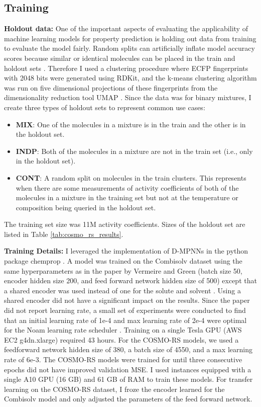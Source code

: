 \subsection{Training}
\noindent
\textbf{Holdout data:} One of the important aspects of evaluating the applicability of machine learning models for property prediction is holding out data from training to evaluate the model fairly. Random splits can artificially inflate model accuracy scores because similar or identical molecules can be placed in the train and holdout sets \cite{Kovacs2021}. Therefore I used a clustering procedure where  ECFP fingerprints with 2048 bits were generated using RDKit, and the k-means clustering algorithm \cite{MacQueen1967} was run on five dimensional projections of these fingerprints from the dimensionality reduction tool UMAP \cite{McInnes2018}. Since the data was for binary mixtures, I create three types of holdout sets to represent common use cases:

\begin{itemize}
    \item \textbf{MIX}: One of the molecules in a mixture is in the train and the other is in the holdout set.
    \item \textbf{INDP}: Both of the molecules in a mixture are not in the train set (i.e., only in the holdout set).
    \item \textbf{CONT}: A random split on molecules in the train clusters. This represents when there are some measurements of activity coefficients of both of the molecules in a mixture in the training set but not at the temperature or composition being queried in the holdout set. 
\end{itemize}

The training set size was 11M activity coefficients. Sizes of the holdout set are listed in Table \ref{tab:cosmo_rs_results}.

\noindent
\textbf{Training Details:} I leveraged the implementation of D-MPNNs in the python package chemprop \cite{Yang2019, Heid2023}. A model was trained on the Combisolv dataset using the same hyperparameters as in the paper by Vermeire and Green (batch size 50, encoder hidden size 200, and feed forward network hidden size of 500) except that a shared encoder was used instead of one for the solute and solvent \cite{Vermeire2021}. Using a shared encoder did not have a significant impact on the results. Since the paper did not report learning rate, a small set of experiments were conducted to find that an initial learning rate of 1e-4 and max learning rate of 2e-4 were optimal for the Noam learning rate scheduler \cite{Vaswani2017}. Training on a single Tesla GPU (AWS EC2 g4dn.xlarge) required 43 hours. For the COSMO-RS models, we used a feedforward network hidden size of 380, a batch size of 4550, and a max learning rate of 6e-3.  The COSMO-RS models were trained for until three consecutive epochs did not have improved validation MSE. I used instances equipped with a single A10 GPU (16 GB) and 61 GB of RAM to train these models. For transfer learning on the COSMO-RS dataset, I froze the encoder learned for the Combisolv model and only adjusted the parameters of the feed forward network.


